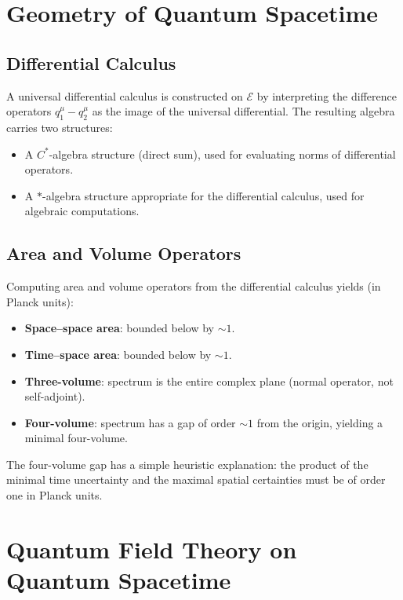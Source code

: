 \documentclass[11pt,a4paper]{article}
\begin{document}
\section{Geometry of Quantum Spacetime}

\subsection{Differential Calculus}

A universal differential calculus is constructed on $\mathcal{E}$
by interpreting the difference operators $q_1^\mu - q_2^\mu$ as
the image of the universal differential. The resulting algebra carries
two structures:
\begin{itemize}[nosep]
  \item A $C^*$-algebra structure (direct sum), used for evaluating norms
        of differential operators.
  \item A $*$-algebra structure appropriate for the differential calculus,
        used for algebraic computations.
\end{itemize}

\subsection{Area and Volume Operators}

Computing area and volume operators from the differential calculus yields
(in Planck units):
\begin{itemize}[nosep]
  \item \textbf{Space--space area}: bounded below by $\sim 1$.
  \item \textbf{Time--space area}: bounded below by $\sim 1$.
  \item \textbf{Three-volume}: spectrum is the entire complex plane
        (normal operator, not self-adjoint).
  \item \textbf{Four-volume}: spectrum has a gap of order $\sim 1$
        from the origin, yielding a minimal four-volume.
\end{itemize}

The four-volume gap has a simple heuristic explanation: the product of
the minimal time uncertainty and the maximal spatial certainties must
be of order one in Planck units.

\section{Quantum Field Theory on Quantum Spacetime}
\end{document}
